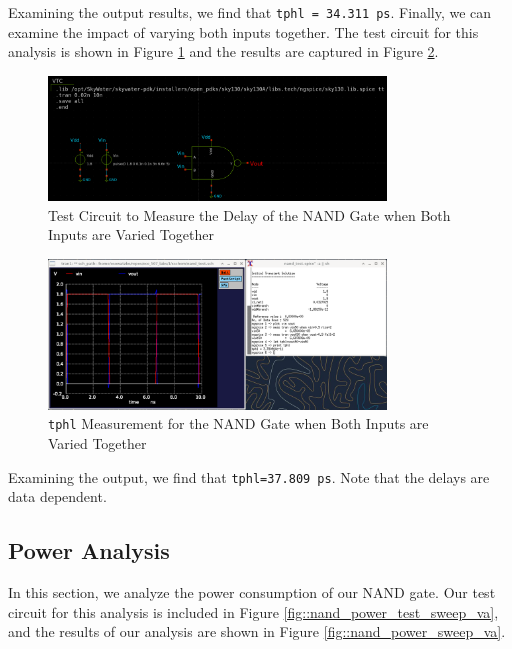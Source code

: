 \documentclass[fleqn]{article}
\begin{document}
	Examining the output results, we find that \texttt{tphl = 34.311 ps}. Finally, we can examine the impact of varying both inputs together. The test circuit for this analysis is shown in Figure  \ref{fig::nand_delay_test_sweep_va_vb} and the results are captured in Figure  \ref{fig::nand_delay_sweep_va_vb}.
	
	\begin{figure}[H]
		\centerline{\includegraphics[width=0.8\textwidth]{nand_delay_test_sweep_va_vb.png}}
		\caption{Test Circuit to Measure the Delay of the NAND Gate when Both Inputs are Varied Together}
		\label{fig::nand_delay_test_sweep_va_vb}
	\end{figure}
	
	\begin{figure}[H]
		\centerline{\includegraphics[width=0.8\textwidth]{nand_delay_sweep_va_vb.png}}
		\caption{\texttt{tphl} Measurement for the NAND Gate when Both Inputs are Varied Together}
		\label{fig::nand_delay_sweep_va_vb}
	\end{figure}
	
	Examining the output, we find that \texttt{tphl=37.809 ps}. Note that the delays are data dependent.
	
	\subsection{Power Analysis}
	
	In this section, we analyze the power consumption of our NAND gate. Our test circuit for this analysis is included in Figure \ref{fig::nand_power_test_sweep_va}, and the results of our analysis are shown in Figure \ref{fig::nand_power_sweep_va}.
	
\end{document}
